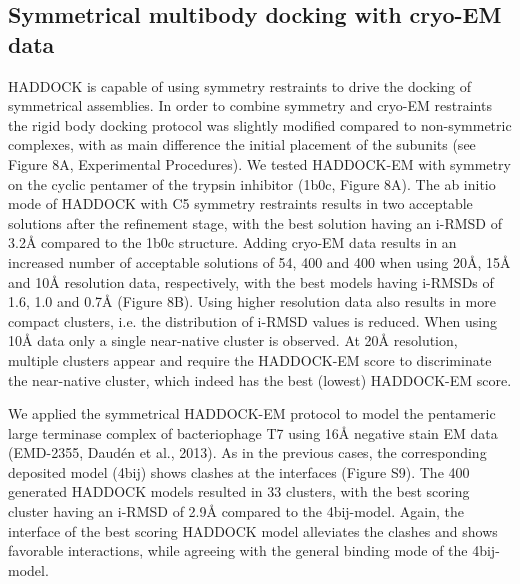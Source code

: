 \subsection{Symmetrical multibody docking with cryo-EM data}

HADDOCK is capable of using symmetry restraints to drive the docking of symmetrical assemblies. In order to combine symmetry and cryo-EM restraints the rigid body docking protocol was slightly modified compared to non-symmetric complexes, with as main difference the initial placement of the subunits (see Figure 8A, Experimental Procedures). We tested HADDOCK-EM with symmetry on the cyclic pentamer of the trypsin inhibitor (1b0c, Figure 8A). The ab initio mode of HADDOCK with C5 symmetry restraints results in two acceptable solutions after the refinement stage, with the best solution having an i-RMSD of 3.2Å compared to the 1b0c structure. Adding cryo-EM data results in an increased number of acceptable solutions of 54, 400 and 400 when using 20Å, 15Å and 10Å resolution data, respectively, with the best models having i-RMSDs of 1.6, 1.0 and 0.7Å (Figure 8B). Using higher resolution data also results in more compact clusters, i.e. the distribution of i-RMSD values is reduced. When using 10Å data only a single near-native cluster is observed. At 20Å resolution, multiple clusters appear and require the HADDOCK-EM score to discriminate the near-native cluster, which indeed has the best (lowest) HADDOCK-EM score. 

We applied the symmetrical HADDOCK-EM protocol to model the pentameric large terminase complex of bacteriophage T7 using 16Å negative stain EM data (EMD-2355, Daudén et al., 2013). As in the previous cases, the corresponding deposited model (4bij) shows clashes at the interfaces (Figure S9). The 400 generated HADDOCK models resulted in 33 clusters, with the best scoring cluster having an i-RMSD of 2.9Å compared to the 4bij-model. Again, the interface of the best scoring HADDOCK model alleviates the clashes and shows favorable interactions, while agreeing with the general binding mode of the 4bij-model.

